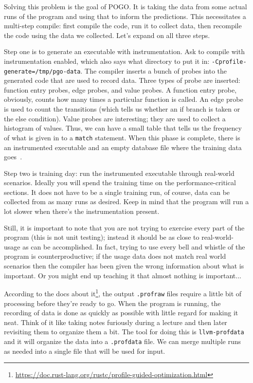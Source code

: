 \documentclass[a4paper]{report}
\begin{document}
Solving this problem is the goal of POGO. It is taking the data from some actual runs of the program and using that to inform the predictions. This necessitates a multi-step compile: first compile the code, run it to collect data, then recompile the code using the data we collected. Let's expand on all three steps.

Step one is to generate an executable with instrumentation. Ask to compile with instrumentation enabled, which also says what directory to put it in: \texttt{-Cprofile-generate=/tmp/pgo-data}. The compiler inserts a bunch of probes into the generated code that are used to record data. Three types of probe are inserted: function entry probes, edge probes, and value probes.  A function entry probe, obviously, counts how many times a particular function is called. An edge probe is used to count the transitions (which tells us whether an if branch is taken or the else condition). Value probes are interesting; they are used to collect a histogram of values. Thus, we can have a small table that tells us the frequency of what is given in to a \texttt{match} statement. When this phase is complete, there is an instrumented executable and an empty database file where the training data goes~\cite{pogo}. 

Step two is training day: run the instrumented executable through real-world scenarios. Ideally you will spend the training time on the performance-critical sections. It does not have to be a single training run, of course, data can be collected from as many runs as desired. Keep in mind that the program will run a lot slower when there's the instrumentation present. 

Still, it is important to note that you are not trying to exercise every part of the program (this is not unit testing); instead it should be as close to real-world-usage as can be accomplished. In fact, trying to use every bell and whistle of the program is counterproductive; if the usage data does not match real world scenarios then  the compiler has been given the wrong information about what is important. Or you might end up teaching it that almost nothing is important... 

According to the docs about it\footnote{\url{https://doc.rust-lang.org/rustc/profile-guided-optimization.html}}, the output \texttt{.profraw} files require a little bit of processing before they're ready to go. When the program is running, the recording of data is done as quickly as possible with little regard for making it neat. Think of it like taking notes furiously during a lecture and then later revisiting them to organize them a bit. The tool for doing this is \texttt{llvm-profdata} and it will organize the data into a \texttt{.profdata} file. We can merge multiple runs as needed into a single file that will be used for input. 
\end{document}
